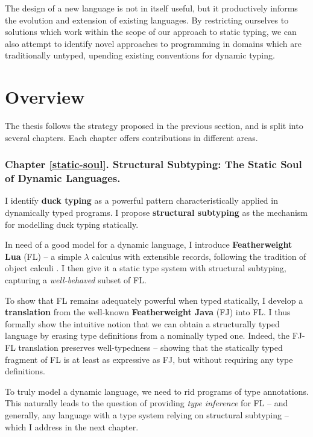 The design of a new language is not in itself useful, but it productively informs the evolution and extension of existing languages.
By restricting ourselves to solutions which work within the scope of our approach to static typing, we can also attempt to identify novel approaches to programming in domains which are traditionally untyped, upending existing conventions for dynamic typing. 

\section{Overview}

The thesis follows the strategy proposed in the previous section, and is split into several chapters. Each chapter offers contributions in different areas.

\subsubsection{Chapter \ref{static-soul}. Structural Subtyping: The Static Soul of Dynamic Languages.} 

I identify \textbf{duck typing} as a powerful pattern characteristically applied in dynamically typed programs. I propose \textbf{structural subtyping} as the mechanism for modelling duck typing statically. 

In need of a good model for a dynamic language, I introduce \textbf{Featherweight Lua} (FL) -- a simple $\lambda$ calculus with extensible records, following the tradition of object calculi \cite{abadi-cardelli-object-calculus}. I then give it a static type system with structural subtyping, capturing a \emph{well-behaved} subset of FL.

To show that FL remains adequately powerful when typed statically, I develop a \textbf{translation} from the well-known \textbf{Featherweight Java} (FJ) into FL. 
I thus formally show the intuitive notion that we can obtain a structurally typed language by erasing type definitions from a nominally typed one.
Indeed, the FJ-FL translation preserves well-typedness -- showing that the statically typed fragment of FL is at least as expressive as FJ, but without requiring any type definitions. 

To truly model a dynamic language, we need to rid programs of type annotations. This naturally leads to the question of providing \emph{type inference} for FL -- and generally, any language with a type system relying on structural subtyping -- which I address in the next chapter.


